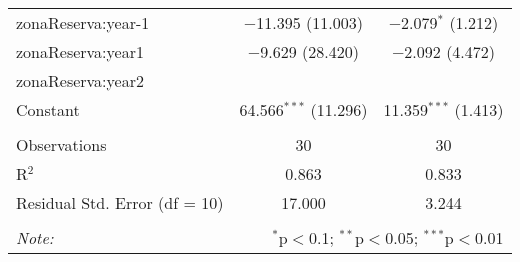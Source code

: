 \documentclass[utf8]{frontiers_suppmat} %
\theoremstyle{definition}
\theoremstyle{definition}
\theoremstyle{definition}
\theoremstyle{remark}
\begin{document}
\begin{table}[!htbp]
\begin{tabular}{@{\extracolsep{1pt}}lcc}
  zonaReserva:year-1 & $-$11.395 (11.003) & $-$2.079$^{*}$ (1.212) \\ 
  zonaReserva:year1 & $-$9.629 (28.420) & $-$2.092 (4.472) \\ 
  zonaReserva:year2 &  &  \\ 
  Constant & 64.566$^{***}$ (11.296) & 11.359$^{***}$ (1.413) \\ 
 \hline \\[-1.8ex] 
Observations & 30 & 30 \\ 
R$^{2}$ & 0.863 & 0.833 \\ 
Residual Std. Error (df = 10) & 17.000 & 3.244 \\ 
\hline 
\hline \\[-1.8ex] 
\textit{Note:}  & \multicolumn{2}{r}{$^{*}$p$<$0.1; $^{**}$p$<$0.05; $^{***}$p$<$0.01} \\ 
\end{tabular} 
\end{table}



%
\end{document}
